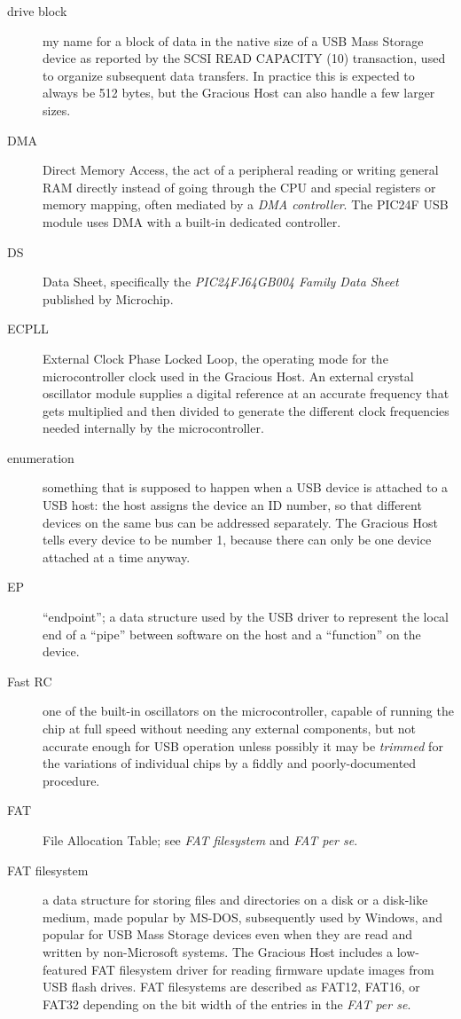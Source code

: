\begin{description}
\item[drive block] my name for a block of data in the native size of a USB
Mass Storage device as reported by the SCSI READ CAPACITY (10) transaction,
used to organize subsequent data transfers.  In practice this is
expected to always be 512 bytes, but the Gracious Host can also handle a few
larger sizes.

\item[DMA] Direct Memory Access, the act of a peripheral reading or writing
general RAM directly instead of going through the CPU and special registers
or memory mapping, often mediated by a \emph{DMA controller}.  The PIC24F
USB module uses DMA with a built-in dedicated controller.

\item[DS] Data Sheet, specifically the \emph{PIC24FJ64GB004 Family Data Sheet}
published by Microchip.

\item[ECPLL] External Clock Phase Locked Loop, the operating mode for the
microcontroller clock used in the Gracious Host.  An external crystal
oscillator module supplies a digital reference at an accurate frequency that
gets multiplied and then divided to generate the different clock frequencies
needed internally by the microcontroller.

\item[enumeration] something that is supposed to happen when a USB device is
attached to a USB host: the host assigns the device an ID number, so
that different devices on the same bus can be addressed separately.  The
Gracious Host tells every device to be number 1, because there can only
be one device attached at a time anyway.

\item[EP] ``endpoint''; a data structure used by the USB driver to represent
the local end of a ``pipe'' between software on the host and a ``function''
on the device.

\item[Fast RC] one of the built-in oscillators on the microcontroller,
capable of running the chip at full speed without needing any external
components, but not accurate enough for USB operation unless possibly it may
be \emph{trimmed} for the variations of individual chips by a fiddly and
poorly-documented procedure.

\item[FAT] File Allocation Table; see \emph{FAT filesystem} and \emph{FAT
per se}.

\item[FAT filesystem] a data structure for storing files and directories on
a disk or a disk-like medium, made popular by MS-DOS, subsequently used by
Windows, and popular for USB Mass Storage devices even when they are read
and written by non-Microsoft systems.  The Gracious Host includes a
low-featured FAT filesystem driver for reading firmware update images from
USB flash drives.  FAT filesystems are described as FAT12, FAT16, or FAT32
depending on the bit width of the entries in the \emph{FAT per se}.


\end{description}
